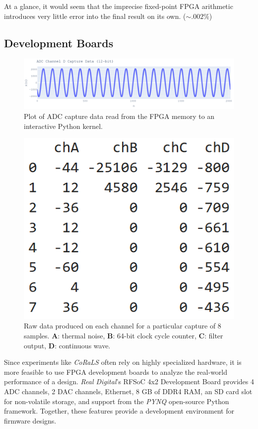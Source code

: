 \documentclass[reprint,amsmath,amssymb,aps,pra]{revtex4-2}
\begin{document}
 At a glance, it would seem that the imprecise fixed-point FPGA arithmetic introduces very little error into the final result on its own. ($\sim .002\%$)

\subsection{Development Boards}

\begin{figure}[t]
    \centering
    \includegraphics[width=\linewidth]{figs/ADC_data.png}
    \caption{Plot of ADC capture data read from the FPGA memory to an interactive Python kernel.}
    \label{fig:pynqwf}
\end{figure}

\begin{figure}[t]
    \centering
    \includegraphics[width=0.67\linewidth]{figs/ADC_table.png}
    \caption{Raw data produced on each channel for a particular capture of 8 samples. \textbf{A}: thermal noise, \textbf{B}: 64-bit clock cycle counter, \textbf{C}: filter output, \textbf{D}: continuous wave.}
    \label{fig:rawdata}
\end{figure}

Since experiments like \textit{CoRaLS} often rely on highly specialized hardware, it is more feasible to use FPGA development boards to analyze the real-world performance of a design. \textit{Real Digital}'s RFSoC 4x2 Development Board provides 4 ADC channels, 2 DAC channels, Ethernet, 8 GB of DDR4 RAM, an SD card slot for non-volatile storage, and support from the \textit{PYNQ} open-source Python framework. Together, these features provide a development environment for firmware designs.
\end{document}

